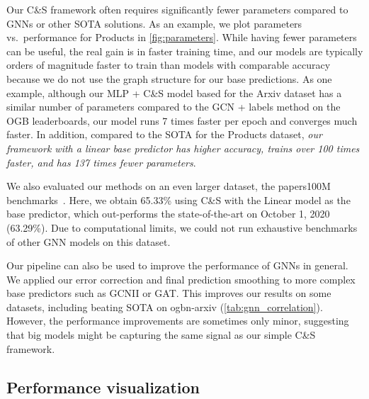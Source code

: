 \documentclass{article}
\newcommand{\framework}{C\&S}
\begin{document}
Our \framework{} framework often requires significantly fewer parameters compared to GNNs or other SOTA solutions. 
As an example, we plot parameters vs.\ performance for Products in \cref{fig:parameters}. 
While having fewer parameters can be useful, the real gain is in faster training time,
and our models are typically orders of magnitude faster to train than models with comparable accuracy
because we do not use the graph structure for our base predictions.
As one example, although our MLP + C\&S model based for the Arxiv dataset has a similar number of parameters compared to the GCN + labels method on the OGB leaderboards, our model runs 7 times faster per epoch and converges much faster.
In addition, compared to the SOTA for the Products dataset, 
\emph{our framework with a linear base predictor has higher accuracy, trains over 100 times faster, and has 137 times fewer parameters}. 

We also evaluated our methods on an even larger dataset, the papers100M benchmarks~\citep{Hu2020OpenGB}.
Here, we obtain 65.33\% using \framework{} with the Linear model as the base predictor, which out-performs the state-of-the-art on October 1, 2020 (63.29\%).
Due to computational limits, we could not run exhaustive benchmarks of other GNN models on this dataset.

Our pipeline can also be used to improve the performance of GNNs in general.
We applied our error correction and final prediction smoothing to more complex base predictors such as GCNII or GAT.
This improves our results on some datasets, including beating SOTA on ogbn-arxiv (\cref{tab:gnn_correlation}).
However, the performance improvements are sometimes only minor, suggesting that big models might
be capturing the same signal as our simple C\&S framework.

\subsection{Performance visualization}
\end{document}
